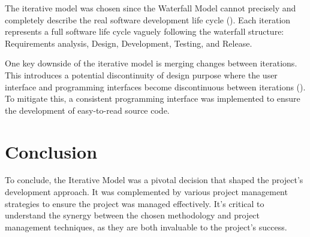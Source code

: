 \clearpage
The iterative model was chosen since the Waterfall Model cannot precisely and completely describe the real software development life cycle (\cite{dapeng_liu_case_2011}). Each iteration represents a full software life cycle vaguely following the waterfall structure: Requirements analysis, Design, Development, Testing, and Release.

One key downside of the iterative model is merging changes between iterations. This introduces a potential discontinuity of design purpose where the user interface and programming interfaces become discontinuous between iterations (\cite{dapeng_liu_case_2011}). To mitigate this, a consistent programming interface was implemented to ensure the development of easy-to-read source code.

\section{Conclusion}

To conclude, the Iterative Model was a pivotal decision that shaped the project's development approach. It was complemented by various project management strategies  to ensure the project was managed effectively. It's critical to understand the synergy between the chosen methodology and project management techniques, as they are both invaluable to the project's success.
